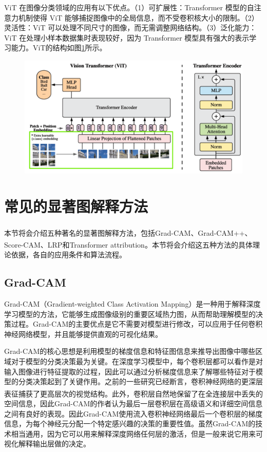 ViT 在图像分类领域的应用有以下优点。（1）可扩展性：Transformer 模型的自注意力机制使得 ViT 能够捕捉图像中的全局信息，而不受卷积核大小的限制。（2）灵活性：ViT 可以处理不同尺寸的图像，而无需调整网络结构。（3）泛化能力：ViT 在处理小样本数据集时表现较好，因为 Transformer 模型具有强大的表示学习能力。ViT的结构如图\ref{fig:vit2}所示。

\begin{figure}[h]
	\centering 
	\includegraphics[width=15cm]{fig/ch2/vit2.png}
	\label{fig:vit2}
\end{figure}


\section{常见的显著图解释方法}
本节将会介绍五种著名的显著图解释方法，包括Grad-CAM\textsuperscript{\cite{selvaraju2017grad}}、Grad-CAM++\textsuperscript{\cite{chattopadhay2018grad}}、Score-CAM\textsuperscript{\cite{wang2020score}}、LRP\textsuperscript{\cite{binder2016layer}}和Transformer attribution\textsuperscript{\cite{chefer2021transformer}}。本节将会介绍这五种方法的具体理论依据，各自的应用条件和算法流程。 
\subsection{Grad-CAM}\label{sub:gradcam}
Grad-CAM（Gradient-weighted Class Activation Mapping）是一种用于解释深度学习模型的方法，它能够生成图像级别的重要区域热力图，从而帮助理解模型的决策过程。Grad-CAM的主要优点是它不需要对模型进行修改，可以应用于任何卷积神经网络模型，并且能够提供直观的可视化结果。

Grad-CAM的核心思想是利用模型的梯度信息和特征图信息来推导出图像中哪些区域对于模型的分类决策最为关键。在深度学习模型中，每个卷积层都可以看作是对输入图像进行特征提取的过程，因此可以通过分析梯度信息来了解哪些特征对于模型的分类决策起到了关键作用。之前的一些研究已经断言，卷积神经网络的更深层表征捕获了更高层次的视觉结构\textsuperscript{\cite{bengio2013representation,mahendran2016visualizing}}。此外，卷积层自然地保留了在全连接层中丢失的空间信息，因此Grad-CAM的作者认为最后一层卷积层在高级语义和详细空间信息之间有良好的表现。因此Grad-CAM使用流入卷积神经网络最后一个卷积层的梯度信息，为每个神经元分配一个特定感兴趣的决策的重要性值。虽然Grad-CAM的技术相当通用，因为它可以用来解释深度网络任何层的激活，但是一般来说它用来可视化解释输出层做的决定。

